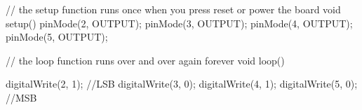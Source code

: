 // the setup function runs once when you press reset or power the board
void setup() {
    pinMode(2, OUTPUT);  
    pinMode(3, OUTPUT);
    pinMode(4, OUTPUT);
    pinMode(5, OUTPUT);
}

// the loop function runs over and over again forever
void loop() {
  
  digitalWrite(2, 1); //LSB
  digitalWrite(3, 0); 
  digitalWrite(4, 1); 
  digitalWrite(5, 0); //MSB
}

